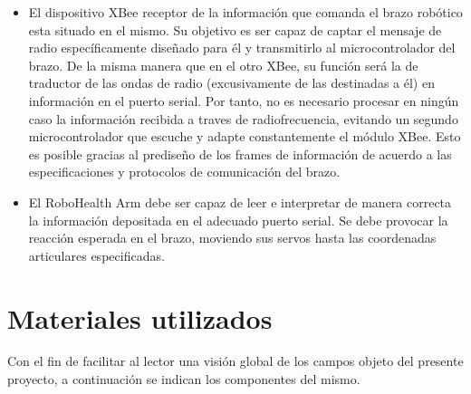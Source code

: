 \begin{itemize}
\item El dispositivo XBee receptor de la información que comanda el brazo robótico esta situado en el mismo. Su objetivo es ser capaz de captar el mensaje de radio específicamente diseñado para él y transmitirlo al microcontrolador del brazo. De la misma manera que en el otro XBee, su función será la de traductor de las ondas de radio (excusivamente de las destinadas a él) en información en el puerto serial. Por tanto, no es necesario procesar en ningún caso la información recibida a traves de radiofrecuencia, evitando un segundo microcontrolador que escuche y adapte constantemente el módulo XBee. Esto es posible gracias al prediseño de los frames de información de acuerdo a las especificaciones y protocolos de comunicación del brazo. 

\item El RoboHealth Arm debe ser capaz de leer e interpretar de manera correcta la información depositada en el adecuado puerto serial. Se debe provocar la reacción esperada en el brazo, moviendo sus servos hasta las coordenadas articulares especificadas.

\end{itemize}


\section{Materiales utilizados}

Con el fin de facilitar al lector una visión global de los campos objeto del presente proyecto, a continuación se indican los componentes del mismo.

